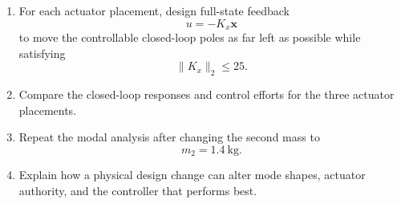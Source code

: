 \begin{enumerate}
    \item For each actuator placement, design full-state feedback
    \begin{equation}
    u=-K_x\mathbf{x}
    \end{equation}
    to move the controllable closed-loop poles as far left as possible
    while satisfying
    \begin{equation}
    \|K_x\|_2\leq 25.
    \end{equation}

    \item Compare the closed-loop responses and control efforts for the three
    actuator placements.

    \item Repeat the modal analysis after changing the second mass to
    \begin{equation}
    m_2=1.4~\mathrm{kg}.
    \end{equation}

    \item Explain how a physical design change can alter mode shapes,
    actuator authority, and the controller that performs best.
\end{enumerate}

